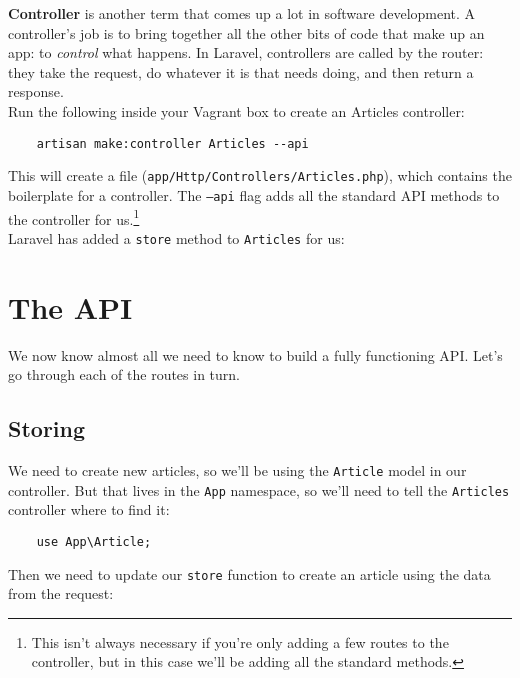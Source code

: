 \textbf{Controller} is another term that comes up a lot in software development. A controller's job is to bring together all the other bits of code that make up an app: to \textit{control} what happens. In Laravel, controllers are called by the router: they take the request, do whatever it is that needs doing, and then return a response.
\\

Run the following inside your Vagrant box to create an Articles controller:

\begin{verbatim}
    artisan make:controller Articles --api
\end{verbatim}

This will create a file (\texttt{app/Http/Controllers/Articles.php}), which contains the boilerplate for a controller. The \texttt{--api} flag adds all the standard API methods to the controller for us.\footnote{This isn't always necessary if you're only adding a few routes to the controller, but in this case we'll be adding all the standard methods.}
\\

Laravel has added a \texttt{store} method to \texttt{Articles} for us:



\pagebreak


\section{The API}

We now know almost all we need to know to build a fully functioning API. Let's go through each of the routes in turn.

\subsection{Storing}

We need to create new articles, so we'll be using the \texttt{Article} model in our controller. But that lives in the \texttt{App} namespace, so we'll need to tell the \texttt{Articles} controller where to find it:

\begin{verbatim}
    use App\Article;
\end{verbatim}

Then we need to update our \texttt{store} function to create an article using the data from the request:

